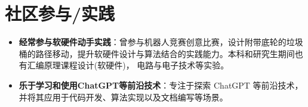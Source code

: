 \documentclass{resume}
\begin{document}


\section{社区参与/实践}
\begin{itemize}[parsep=0.2ex]  
  \item \textbf{经常参与软硬件动手实践}：曾参与机器人竞赛创意比赛，设计附带底轮的垃圾桶的路径移动，提升软硬件设计与算法结合的实践能力。本科和研究生期间也有汇编原理课程设计(软硬件)， 电路与电子技术等实验。
  \item \textbf{乐于学习和使用ChatGPT等前沿技术}：专注于探索 ChatGPT 等前沿技术，并将其应用于代码开发、算法实现以及文档编写等场景。
  
\end{itemize}

%
%
\end{document}
